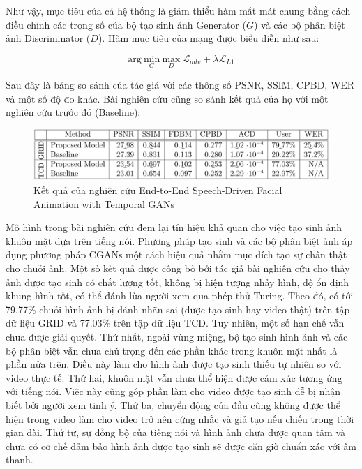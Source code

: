 Như vậy, mục tiêu của cả hệ thống là giảm thiểu hàm mất mát chung bằng cách điều chỉnh các trọng số của bộ tạo sinh ảnh Generator ($G$) và các bộ phân biệt ảnh Discriminator ($D$). Hàm mục tiêu của mạng được biểu diễn như sau:

\begin{equation}
    \mathrm{arg}\: \underset{G}{\mathrm{min}}\: \underset{D}{\mathrm{max}}\: \mathcal{L}_{adv} + \lambda\mathcal{L}_{L1}
    \label{eqn:vou2019_loss}
\end{equation}

Sau đây là bảng so sánh của tác giả với các thông số PSNR, SSIM, CPBD, WER và một số độ đo khác. Bài nghiên cứu cũng so sánh kết quả của họ với một nghiên cứu trước đó (Baseline):

\begin{figure}[H]
    \centering
    \includegraphics[width=15cm]{./content/images/vou2019_result.png}
    \caption{Kết quả của nghiên cứu End-to-End Speech-Driven Facial Animation with Temporal GANs}
    \label{fig:vou2019_result}
\end{figure}

Mô hình trong bài nghiên cứu đem lại tín hiệu khả quan cho việc tạo sinh ảnh khuôn mặt dựa trên tiếng nói. Phương pháp tạo sinh và các bộ phân biệt ảnh áp dụng phương pháp CGANs một cách hiệu quả nhằm mục đích tạo sự chân thật cho chuỗi ảnh. Một số kết quả được công bố bởi tác giả bài nghiên cứu cho thấy ảnh được tạo sinh có chất lượng tốt, không bị hiện tượng nhảy hình, độ ổn định khung hình tốt, có thể đánh lừa người xem qua phép thử Turing. Theo đó, có tới 79.77\% chuỗi hình ảnh bị đánh nhãn sai (được tạo sinh hay video thật) trên tập dữ liệu GRID và 77.03\% trên tập dữ liệu TCD. Tuy nhiên, một số hạn chế vẫn chưa được giải quyết. Thứ nhất, ngoài vùng miệng, bộ tạo sinh hình ảnh và các bộ phân biệt vẫn chưa chú trọng đến các phần khác trong khuôn mặt nhất là phần nửa trên. Điều này làm cho hình ảnh được tạo sinh thiếu tự nhiên so với video thực tế. Thứ hai, khuôn mặt vẫn chưa thể hiện được cảm xúc tương ứng với tiếng nói. Việc này cũng góp phần làm cho video được tạo sinh dễ bị nhận biết bởi người xem tinh ý. Thứ ba, chuyển động của đầu cũng không được thể hiện trong video làm cho video trở nên cứng nhắc và giả tạo nếu chiếu trong thời gian dài. Thứ tư, sự đồng bộ của tiếng nói và hình ảnh chưa được quan tâm và chưa có cơ chế đảm bảo hình ảnh được tạo sinh sẽ được căn giờ chuẩn xác với âm thanh.

